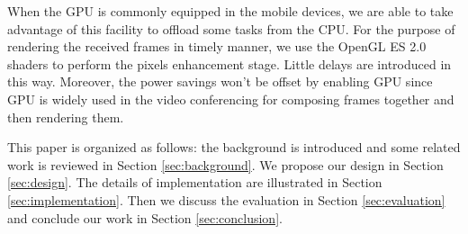 When the GPU is commonly equipped in the mobile devices, we are able
to take advantage of this facility to offload some tasks from the
CPU. For the purpose of rendering the received frames in timely
manner, we use the OpenGL ES 2.0 shaders to perform the pixels
enhancement stage. Little delays are introduced in this way. Moreover,
the power savings won't be offset by enabling GPU since GPU is widely
used in the video conferencing for composing frames together and then
rendering them.

This paper is organized as follows: the background is introduced and
some related work is reviewed in Section \ref{sec:background}. We propose
our design in Section \ref{sec:design}. The details of implementation
are illustrated in Section \ref{sec:implementation}. Then we discuss
the evaluation in Section \ref{sec:evaluation} and conclude our work
in Section \ref{sec:conclusion}.
\fi








